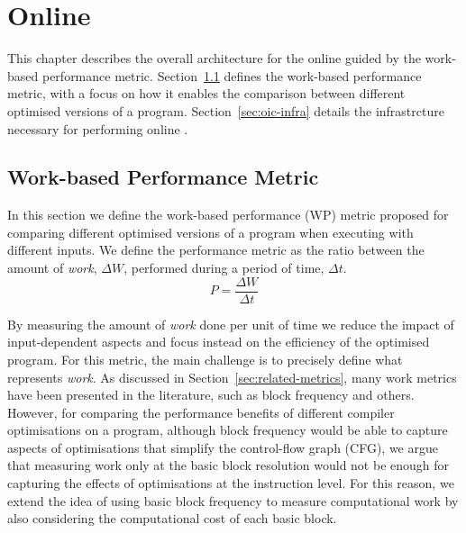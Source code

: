 
\chapter{Online {\IterComp}}\label{chap:oic}

This chapter describes the overall architecture for the online {\itercomp} guided by the work-based performance metric.
Section~\ref{sec:metric} defines the work-based performance metric, with a focus on how it enables the comparison between different optimised versions of a program.
Section~\ref{sec:oic-infra} details the infrastrcture necessary for performing online {\itercomp}.

\section{Work-based Performance Metric}\label{sec:metric}

In this section we define the work-based performance (WP) metric proposed for comparing different optimised versions of a program when executing with different inputs.
We define the performance metric as the ratio between the amount of \textit{work}, $\Delta W$, performed during a period of time, $\Delta t$.
\[
   P = \frac{\Delta W}{\Delta t}
\]

By measuring the amount of \textit{work} done per unit of time we reduce the impact of input-dependent aspects and focus instead on the efficiency of the optimised program.
For this metric, the main challenge is to precisely define what represents \textit{work}.
As discussed in Section~\ref{sec:related-metrics}, many work metrics have been presented in the literature, such as block frequency and others.
However, for comparing the performance benefits of different compiler optimisations on a program, although block frequency would be able to capture aspects of optimisations that simplify the control-flow graph (CFG), we argue that measuring work only at the basic block resolution would not be enough for capturing the effects of optimisations at the instruction level.
For this reason, we extend the idea of using basic block frequency to measure computational work by also considering the computational cost of each basic block.

